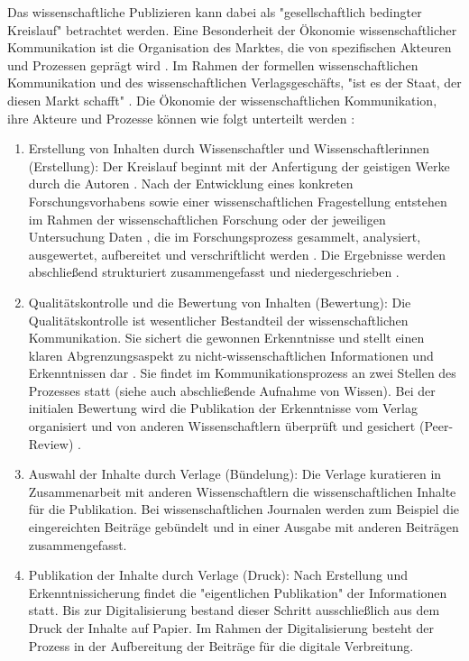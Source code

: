 Das wissenschaftliche Publizieren kann dabei als "gesellschaftlich bedingter Kreislauf" \cite{schirmbacher_2009_wisspub} betrachtet werden. Eine Besonderheit der Ökonomie wissenschaftlicher Kommunikation ist die Organisation des Marktes, die von spezifischen Akteuren und Prozessen geprägt wird \cite{Hess_2006}. Im Rahmen der formellen wissenschaftlichen Kommunikation und des wissenschaftlichen Verlagsgeschäfts, "ist es der Staat, der diesen Markt schafft" \cite{Hirschi_2015_buch_oa}. Die Ökonomie der wissenschaftlichen Kommunikation, ihre Akteure und Prozesse können wie folgt unterteilt werden \cite{cite:11b} \cite{Hess_2006}:
\begin{enumerate}
\item Erstellung von Inhalten durch Wissenschaftler und Wissenschaftlerinnen (Erstellung): Der Kreislauf beginnt mit der Anfertigung der geistigen Werke durch die Autoren \cite{schirmbacher_2009_wisspub}. Nach der Entwicklung eines konkreten Forschungsvorhabens sowie einer wissenschaftlichen Fragestellung entstehen im Rahmen der wissenschaftlichen Forschung oder der jeweiligen Untersuchung Daten \cite{cite:11c}, die im Forschungsprozess gesammelt, analysiert, ausgewertet, aufbereitet und verschriftlicht werden \cite{cite:11d}. Die Ergebnisse werden abschließend strukturiert zusammengefasst und niedergeschrieben \cite{Hess_2006}.
\item Qualitätskontrolle und die Bewertung von Inhalten (Bewertung):
Die Qualitätskontrolle ist wesentlicher Bestandteil der wissenschaftlichen Kommunikation. Sie sichert die gewonnen Erkenntnisse \cite{cite:11e} und stellt einen klaren Abgrenzungsaspekt zu nicht-wissenschaftlichen Informationen und Erkenntnissen dar \cite{cite:11f}. Sie findet im Kommunikationsprozess an zwei Stellen des Prozesses statt (siehe auch abschließende Aufnahme von Wissen). Bei der initialen Bewertung wird die Publikation der Erkenntnisse vom Verlag organisiert \cite{schirmbacher_2009_wisspub} und von anderen Wissenschaftlern überprüft und gesichert (Peer-Review) \cite{Hess_2006}.
\item Auswahl der Inhalte durch Verlage (Bündelung):
Die Verlage kuratieren in Zusammenarbeit mit anderen Wissenschaftlern die wissenschaftlichen Inhalte für die Publikation. Bei wissenschaftlichen Journalen werden zum Beispiel die eingereichten Beiträge gebündelt und in einer Ausgabe mit anderen Beiträgen zusammengefasst.
\item Publikation der Inhalte durch Verlage (Druck):
Nach Erstellung und Erkenntnissicherung findet die "eigentlichen Publikation" \cite{schirmbacher_2009_wisspub} der Informationen statt. Bis zur Digitalisierung bestand dieser Schritt ausschließlich aus dem Druck der Inhalte auf Papier.\cite{cite:11h} Im Rahmen der Digitalisierung besteht der Prozess in der Aufbereitung der Beiträge für die digitale Verbreitung.

\end{enumerate}
